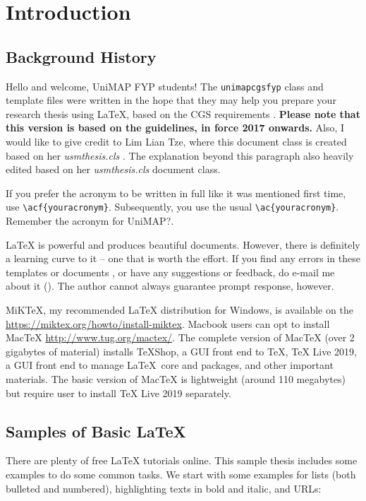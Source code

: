 \chapter{Introduction}\label{chap:intro}

\section{Background History}
Hello and welcome, \ac{UniMAP} FYP students!  The \verb|unimapcgsfyp| class and template files were written in the hope that they may help you prepare your research thesis using \LaTeX, based on the \ac{CGS} requirements \citep{cgs:thesis:guideline:2017}. \textbf{Please note that this version is based on the guidelines, in force 2017 onwards.} Also, I would like to give credit to Lim Lian Tze, where this document class is created based on her \emph{usmthesis.cls} \cite{lim:2007}. The explanation beyond this paragraph also heavily edited based on her \emph{usmthesis.cls} document class. 

If you prefer the acronym to be written in full like it was mentioned first time, use \verb|\acf{youracronym}|. Subsequently, you use the usual \verb|\ac{youracronym}|. Remember the acronym for \acf{UniMAP}?. 

\LaTeX{} is powerful and produces beautiful documents.  However, there is definitely a learning curve to it -- one that is worth the effort.  %
If you find any errors in these templates or documents \citep{matsom:template}, or have any suggestions or feedback, do e-mail me about it ().  The author cannot always guarantee prompt response, however. %

MiK\TeX{}, my recommended \LaTeX{} distribution for Windows, is available on the \url{https://miktex.org/howto/install-miktex}. Macbook users can opt to install MacTeX \url{http://www.tug.org/mactex/}. The complete version of MacTeX (over 2 gigabytes of material) installs TeXShop, a GUI front end to TeX, TeX Live 2019, a GUI front end to manage \LaTeX~core and packages, and other important materials. The basic version of MacTeX is lightweight (around 110 megabytes) but require user to install TeX Live 2019 separately.

\section{Samples of Basic \LaTeX{}}

There are plenty of free \LaTeX{} tutorials online.  This sample thesis includes some examples to do some common tasks.  We start with some examples for lists (both bulleted and numbered), highlighting texts in bold and italic, and URLs:

